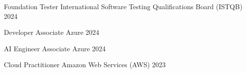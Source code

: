 

\begin{cvhonors}

  \cvhonor
    {Foundation Tester} %
    {International Software Testing Qualifications Board (ISTQB)} %
    {} %
    {2024} %

  \cvhonor
    {Developer Associate} %
    {Azure} %
    {} %
    {2024} %

  \cvhonor
    {AI Engineer Associate} %
    {Azure} %
    {} %
    {2024} %

  \cvhonor
    {Cloud Practitioner} %
    {Amazon Web Services (AWS)} %
    {} %
    {2023} %

\end{cvhonors}
